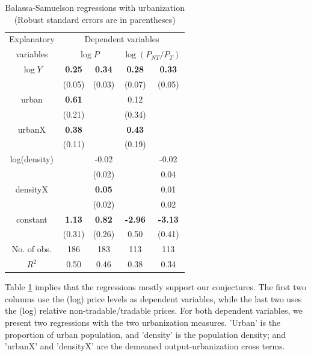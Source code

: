 \documentclass[12pt]{article}
\begin{document}
\begin{table}[h!]
\caption{Balassa-Samuelson regressions with urbanization (Robust
standard errors are in parentheses)} \center \label{tab:BS}
\begin{tabular}{c|cc|cc}
  \hline\hline
  Explanatory & \multicolumn{4}{c}{Dependent variables} \\
  variables &\multicolumn{2}{c}{$\log P$} & \multicolumn{2}{c}{$\log(P_{NT}/P_T)$} \\ \hline
  $\log Y$ & \textbf{0.25} & \textbf{0.34} & \textbf{0.28}   & \textbf{0.33} \\
           & (0.05)        & (0.03)        & (0.07)          & (0.05)        \\
  urban    & \textbf{0.61} &               & 0.12            &               \\
           & (0.21)        &               & (0.34)          &               \\
  urbanX   & \textbf{0.38} &               & \textbf{0.43}   &              \\
           & (0.11)        &               & (0.19)          &              \\
  log(density) &           & -0.02         &                 & -0.02        \\
             &             & (0.02)        &                 &  0.04        \\
  densityX &               & \textbf{0.05} &                  & 0.01         \\
           &               & (0.02)        &                 & 0.02         \\
  constant & \textbf{1.13} & \textbf{0.82} & \textbf{-2.96}  & \textbf{-3.13}\\
           & (0.31)        & (0.26)        & 0.50            & (0.41)        \\ \hline
  No. of obs. & 186        & 183           & 113             & 113          \\
  $R^2$    & 0.50          & 0.46          & 0.38            & 0.34  \\
  \hline\hline
\end{tabular}
\end{table}

Table \ref{tab:BS} implies that the regressions mostly support our
conjectures. The first two columns use the (log) price levels as
dependent variables, while the last two uses the (log) relative
non-tradable/tradable prices. For both dependent variables, we
present two regressions with the two urbanization measures. 'Urban'
is the proportion of urban population, and 'density' is the
population density; and 'urbanX' and 'densityX' are the demeaned
output-urbanization cross terms.
\end{document}
